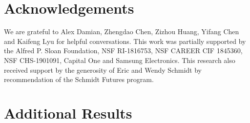 \documentclass{article}
\theoremstyle{plain}
\theoremstyle{remark}
\begin{document}


\section*{Acknowledgements}
We are grateful to Alex Damian, Zhengdao Chen, Zizhou Huang, Yifang Chen and Kaifeng Lyu for helpful conversations. 
This work was partially supported by the Alfred P. Sloan Foundation, NSF RI-1816753, NSF CAREER CIF 1845360, NSF CHS-1901091, Capital One and Samsung Electronics. This research also received support by the generosity of Eric and Wendy Schmidt by recommendation of the Schmidt Futures program.



% 
% 

\setcounter{tocdepth}{2}

\newpage

\onecolumn
\appendix
\tableofcontents


\section{Additional Results}
\label{app:addres}
\end{document}
